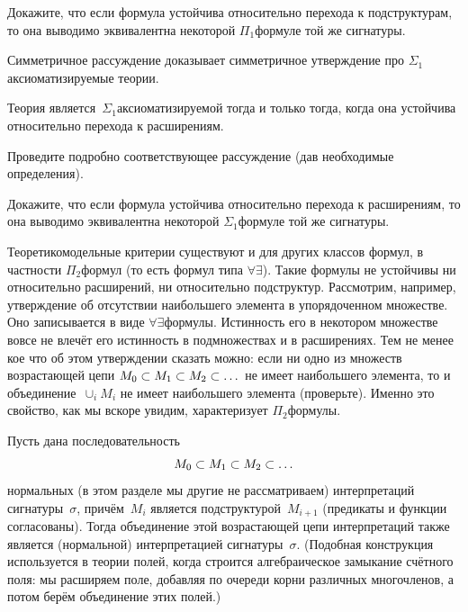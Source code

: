 \begin{problem}
Докажите, что если формула устойчива относительно перехода к
подструктурам, то она выводимо эквивалентна некоторой $\Pi_1$\д формуле той
же сигнатуры.
\end{problem}

Симметричное рассуждение доказывает симметричное утверждение про
$\Sigma_1$\д аксиоматизируемые теории.%
%

\begin{theorem}
Теория является~$\Sigma_1$\д аксиоматизируемой тогда и только
тогда, когда она устойчива относительно перехода к рас\-ши\-ре\-ниям.
\end{theorem}

\begin{problem}
Проведите подробно соответствующее рассуждение (дав необходимые
определения).
\end{problem}

\begin{problem}
Докажите, что если формула устойчива относительно перехода к
расширениям, то она выводимо эквивалентна некоторой $\Sigma_1$\д формуле
той же сигнатуры.
\end{problem}

Теоретико\д модельные критерии существуют и для других классов
формул, в частности $\Pi_2$\д формул (то есть формул типа
$\forall\exists$). Такие формулы не устойчивы ни относительно
расширений, ни относительно подструктур. Рассмотрим, например,
утверждение об отсутствии наибольшего элемента в упорядоченном
множестве. Оно записывается в виде $\forall\exists$\д формулы.
Истинность его в некотором множестве вовсе не влечёт его
истинность в подмножествах и в расширениях. Тем не менее кое\д
что об этом утверждении сказать можно: если ни одно из множеств
возрастающей цепи
        $
M_0\hm\subset M_1\hm\subset M_2\hm\subset\dots
        $
не имеет наибольшего элемента, то и объединение~$\cup_i M_i$ не
имеет наибольшего элемента (проверьте). Именно это свойство, как
мы вскоре увидим, характеризует $\Pi_2$\д формулы.

Пусть дана последовательность
        $$
M_0\hm\subset M_1\hm\subset M_2\hm\subset\ldots
        $$
нормальных (в этом разделе мы другие не рассматриваем)
интерпретаций сигнатуры~$\sigma$, причём~$M_i$ является
подструктурой~$M_{i+1}$ (предикаты и функции согласованы). Тогда
объединение этой возрастающей цепи интерпретаций также является
(нормальной) интерпретацией сигнатуры~$\sigma$. (Подобная
конструкция используется в теории полей, когда строится
алгебраическое замыкание счётного поля: мы расширяем поле,
добавляя по очереди корни различных многочленов, а потом берём
объединение этих полей.)

